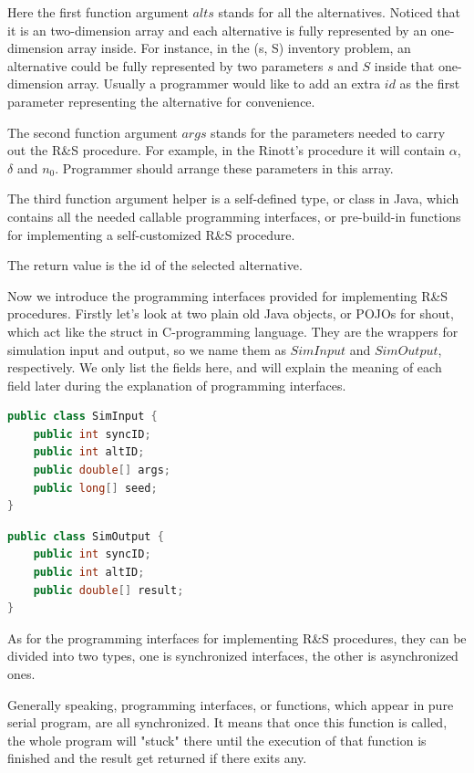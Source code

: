 Here the first function argument $alts$ stands for all the alternatives. Noticed that it is an two-dimension array and each alternative is fully represented by an one-dimension array inside. For instance, in the (s, S) inventory problem, an alternative could be fully represented by two parameters $s$ and $S$ inside that one-dimension array. Usually a programmer would like to add an extra $id$ as the first parameter representing the alternative for convenience.

The second function argument $args$ stands for the parameters needed to carry out the R\&S procedure. For example, in the Rinott's procedure it will contain $\alpha$, $\delta$ and $n_0$. Programmer should arrange these parameters in this array.

The third function argument helper is a self-defined type, or class in Java, which contains all the needed callable programming interfaces, or pre-build-in functions for implementing a self-customized R\&S procedure.

The return value is the id of the selected alternative.

Now we introduce the programming interfaces provided for implementing R\&S procedures. Firstly let's look at two plain old Java objects, or POJOs for shout, which act like the struct in C-programming language. They are the wrappers for simulation input and output, so we name them as $SimInput$ and $SimOutput$, respectively. We only list the fields here, and will explain the meaning of each field later during the explanation of programming interfaces.

\begin{lstlisting}[language=Java]
public class SimInput {
	public int syncID;
	public int altID;
	public double[] args;
	public long[] seed;
}
\end{lstlisting}

\begin{lstlisting}[language=Java]
public class SimOutput {
	public int syncID;
	public int altID;
	public double[] result;
}
\end{lstlisting}

As for the programming interfaces for implementing R\&S procedures, they can be divided into two types, one is synchronized interfaces, the other is asynchronized ones.

Generally speaking, programming interfaces, or functions, which appear in pure serial program, are all synchronized. It means that once this function is called, the whole program will "stuck" there until the execution of that function is finished and the result get returned if there exits any.

